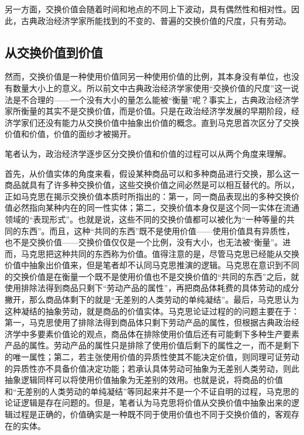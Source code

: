 另一方面，交换价值会随着时间和地点的不同上下波动，具有偶然性和相对性。因此，古典政治经济学家所能找到的不变的、普遍的交换价值的尺度，只有劳动。\cite[49-51]{ZhongGongZhongYangMaKeSiEnGeSiLieNingSiDaLinZhuZuoBianYiJuMaKeSiEnGeSiWenJiDi5Juan2009}\cite[28-30]{YaDang*SiMiGuoFuLun2015}

\subsection{从交换价值到价值}

然而，交换价值是一种使用价值同另一种使用价值的比例，其本身没有单位，也没有数量大小上的意义。所以前文中古典政治经济学家使用“交换价值的尺度”这一说法是不合理的——一个没有大小的量怎么能被“衡量”呢？事实上，古典政治经济学家所衡量的其实不是交换价值，而是价值。只是在政治经济学发展的早期阶段，经济学家们还没有能力从交换价值中抽象出价值的概念。直到马克思首次区分了交换价值和价值，价值的面纱才被揭开\cite[86-87]{ChenDaiSunCongGuDianJingJiXuePaiDaoMaKeSiRuoGanZhuYaoXueShuoFaZhanLueLun2014}。

笔者认为，政治经济学逐步区分交换价值和价值的过程可以从两个角度来理解。

首先，从价值实体的角度来看，假设某种商品可以和多种商品进行交换，那么这一商品就具有了许多种交换价值，这些交换价值之间必然是可以相互替代的。所以，正如马克思在揭示交换价值本质时所指出的：第一，同一商品表现出的多种交换价值必然指向某种内在的同一性实体；第二，交换价值本身仅是这个同一实体在流通领域的“表现形式”\cite[49]{ZhongGongZhongYangMaKeSiEnGeSiLieNingSiDaLinZhuZuoBianYiJuMaKeSiEnGeSiWenJiDi5Juan2009}。也就是说，这些不同的交换价值都可以被化为“一种等量的共同的东西”\cite[49]{ZhongGongZhongYangMaKeSiEnGeSiLieNingSiDaLinZhuZuoBianYiJuMaKeSiEnGeSiWenJiDi5Juan2009}。而且，这种“共同的东西”既不是使用价值——使用价值具有异质性，也不是交换价值——交换价值仅仅是一个比例，没有大小，也无法被“衡量”。进而，马克思把这种共同的东西称为价值\cite[50]{ZhongGongZhongYangMaKeSiEnGeSiLieNingSiDaLinZhuZuoBianYiJuMaKeSiEnGeSiWenJiDi5Juan2009}。值得注意的是，尽管马克思已经能从交换价值中抽象出价值来，但是笔者却不认同马克思推演的逻辑。马克思在意识到不同的交换价值是在衡量一个既不是使用价值也不是交换价值的“共同的东西”之后，就使用排除法得到商品只剩下“劳动产品的属性”\cite[50-51]{ZhongGongZhongYangMaKeSiEnGeSiLieNingSiDaLinZhuZuoBianYiJuMaKeSiEnGeSiWenJiDi5Juan2009}，再把商品体耗费的具体劳动的成分撇开，那么商品体剩下的就是“无差别的人类劳动的单纯凝结”。最后，马克思认为这种凝结的抽象劳动，就是商品的价值实体\cite[51]{ZhongGongZhongYangMaKeSiEnGeSiLieNingSiDaLinZhuZuoBianYiJuMaKeSiEnGeSiWenJiDi5Juan2009}。马克思论证过程的的问题主要在于：第一，马克思使用了排除法得到商品体只剩下劳动产品的属性，但根据古典政治经济学中多要素价值论的观点，商品体在排除使用价值后还有可能剩下多种生产要素产品的属性。劳动产品的属性只是排除了使用价值后剩下的属性之一，而不是剩下的唯一属性；第二，若主张使用价值的异质性使其不能决定价值，则同理可证劳动的异质性亦不具备价值决定功能；若承认具体劳动可抽象为无差别人类劳动，则此抽象逻辑同样可以将使用价值抽象为无差别的效用\cite[84]{CaiJiMingLunJieZhiJueDingYuJieZhiFenPeiDeTongYi2003}。也就是说，将商品的价值和“无差别的人类劳动的单纯凝结”等同起来并不是一个不证自明的过程，马克思的论证逻辑是存在问题的。但是，笔者认为马克思将价值从交换价值中抽象出来的逻辑过程是正确的，价值确实是一种既不同于使用价值也不同于交换价值的，客观存在的实体。

